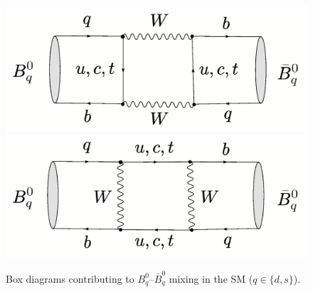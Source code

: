 \documentclass[11pt]{cernrep}
\begin{document}
\begin{figure}
\centerline{
 \includegraphics[width=5.9truecm]{BqBqbar-box1.ps}
 \hspace*{0.5truecm}
 \includegraphics[width=5.9truecm]{BqBqbar-box2.ps}  
 }
 \vspace*{-0.4truecm}
 \caption{Box diagrams contributing to $B^0_q$--$\bar B^0_q$ mixing in the
 SM ($q\in\{d,s\}$).}
   \label{fig:boxes}
\end{figure}


%
%
%
\end{document}
